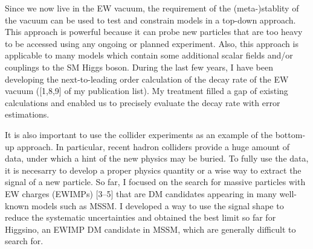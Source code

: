 \documentclass[12pt,notitlepage]{article}
\begin{document}
Since we now live in the EW vacuum, the requirement of the (meta-)stablity of the vacuum can be used to test and constrain models in a top-down approach.
This approach is powerful because it can probe new particles that are too heavy to be accessed using any ongoing or planned experiment.
Also, this approach is applicable to many models which contain some additional scalar fields and/or couplings to the SM Higgs boson.
During the last few years, I have been developing the next-to-leading order calculation of the decay rate of the EW vacuum ([1,8,9] of my publication list).
My treatment filled a gap of existing calculations and enabled us to precisely evaluate the decay rate with error estimations.

It is also important to use the collider experiments as an example of the bottom-up approach.
In particular, recent hadron colliders provide a huge amount of data, under which a hint of the new physics may be buried.
To fully use the data, it is necesarry to develop a proper physics quantity or a wise way to extract the signal of a new particle.
So far, I focused on the search for massive particles with EW charges (EWIMPs) [3--5] that are DM candidates appearing in many well-known models such as MSSM.
I developed a way to use the signal shape to reduce the systematic uncertainties and obtained the best limit so far for Higgsino, an EWIMP DM candidate in MSSM, which are generally difficult to search for.
\end{document}
